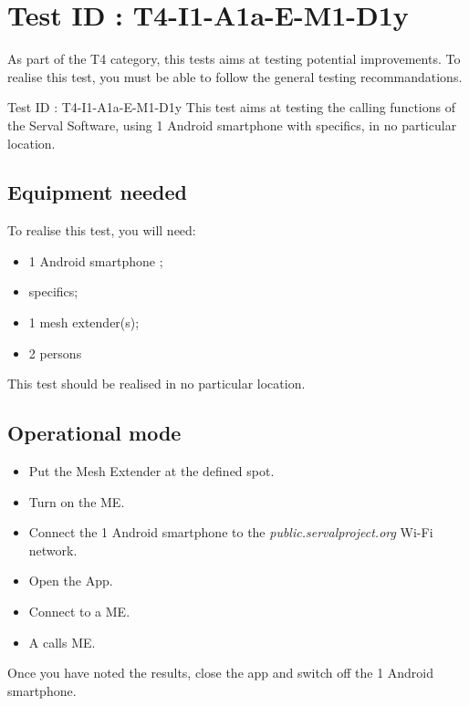 \documentclass[oneside]{book}
\begin{document}
\section{Test ID : T4-I1-A1a-E-M1-D1y}
\begin{itshape}
As part of the T4 category, this tests aims at testing potential improvements.
To realise this test, you must be able to follow the general testing recommandations. 
\end{itshape}
\newline
Test ID : T4-I1-A1a-E-M1-D1y
 This test aims at testing the calling functions of the Serval Software, using 1 Android smartphone with  specifics, in no particular location.
\subsection{Equipment needed} To realise this test, you will need:
\begin{itemize}
\item 1 Android smartphone ;
\item  specifics;
\item 1 mesh extender(s);
\item 2 persons
\end{itemize}
This test should be realised in no particular location.
\subsection{Operational mode} \begin{itemize}
\item Put the Mesh Extender at the defined spot.
\item Turn on the ME.
\item Connect the 1 Android smartphone to the \emph{public.servalproject.org} Wi-Fi network.
\item Open the App.
\item Connect to a ME.
\item A calls ME.
\end{itemize}
Once you have noted the results, close the app and switch off the 1 Android smartphone.
\end{document}
